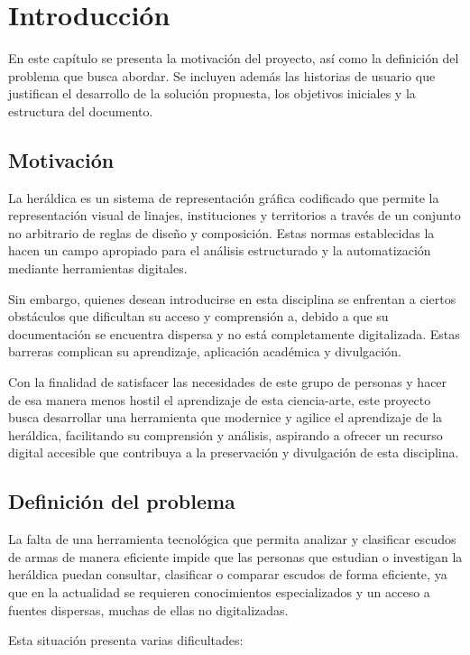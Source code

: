 \chapter{Introducción}

En este capítulo se presenta la motivación del proyecto, así como la definición
del problema que busca abordar. Se incluyen además las historias de usuario que
justifican el desarrollo de la solución propuesta, los objetivos iniciales y la
estructura del documento.

\section{Motivación}
La heráldica es un sistema de representación gráfica codificado que permite
la representación visual de linajes, instituciones y territorios a través de
un conjunto no arbitrario de reglas de diseño y composición. Estas normas
establecidas la hacen un campo apropiado para el análisis estructurado y la
automatización mediante herramientas digitales.

Sin embargo, quienes desean introducirse en esta disciplina se enfrentan a
ciertos obstáculos que dificultan su acceso y comprensión a, debido a que su
documentación se encuentra dispersa y no está completamente digitalizada. Estas 
barreras complican su aprendizaje, aplicación académica y divulgación.

Con la finalidad de satisfacer las necesidades de este grupo de personas y hacer
de esa manera menos hostil el aprendizaje de esta ciencia-arte, este proyecto busca 
desarrollar una herramienta que modernice y agilice el aprendizaje de la heráldica, 
facilitando su comprensión y análisis, aspirando a ofrecer un recurso digital accesible
que contribuya a la preservación y divulgación de esta disciplina.

\section{Definición del problema}

La falta de una herramienta tecnológica que permita analizar y clasificar escudos de 
armas de manera eficiente impide que las personas que estudian o investigan la heráldica
puedan consultar, clasificar o comparar escudos de forma eficiente, ya que en la actualidad
se requieren conocimientos especializados y un acceso a fuentes dispersas, muchas de ellas
no digitalizadas.

Esta situación presenta varias dificultades:

